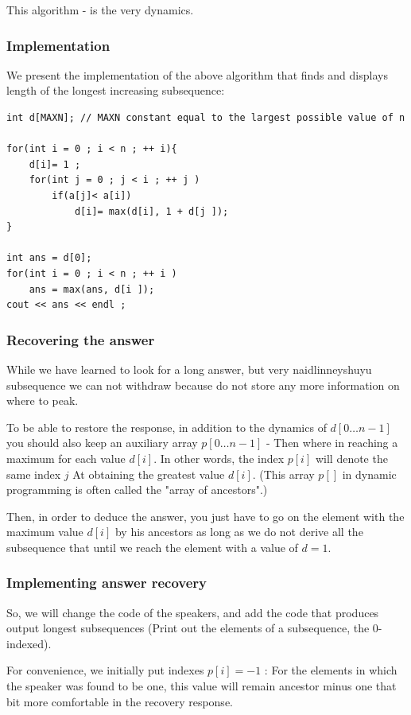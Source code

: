 This algorithm - is the very dynamics.

\subsubsection{ Implementation }

We present the implementation of the above algorithm that finds and displays length of the longest increasing subsequence:

\begin{verbatim}
int d[MAXN]; // MAXN constant equal to the largest possible value of n
 
for(int i = 0 ; i < n ; ++ i){
    d[i]= 1 ;
    for(int j = 0 ; j < i ; ++ j )
        if(a[j]< a[i])
            d[i]= max(d[i], 1 + d[j ]);
}
 
int ans = d[0];
for(int i = 0 ; i < n ; ++ i )
    ans = max(ans, d[i ]);
cout << ans << endl ; 
\end{verbatim}
\subsubsection{ Recovering the answer }

While we have learned to look for a long answer, but very naidlinneyshuyu subsequence we can not withdraw because do not store any more information on where to peak.

To be able to restore the response, in addition to the dynamics of $d [0 \ldots n-1]$ you should also keep an auxiliary array $p [0 \ldots n-1]$ - Then where in reaching a maximum for each value $d [i]$. In other words, the index $p [i]$ will denote the same index $j$ At obtaining the greatest value $d [i]$. (This array $p []$ in dynamic programming is often called the "array of ancestors".)

Then, in order to deduce the answer, you just have to go on the element with the maximum value $d [i]$ by his ancestors as long as we do not derive all the subsequence that until we reach the element with a value of $d = 1$.

\subsubsection{ Implementing answer recovery  }

So, we will change the code of the speakers, and add the code that produces output longest subsequences (Print out the elements of a subsequence, the 0-indexed).

For convenience, we initially put indexes $p [i] = -1$ : For the elements in which the speaker was found to be one, this value will remain ancestor minus one that bit more comfortable in the recovery response.

